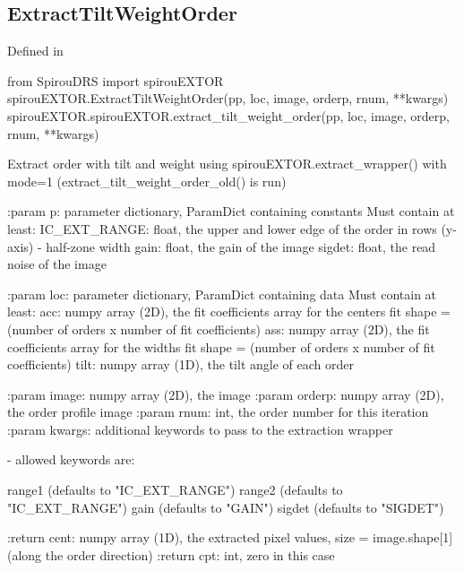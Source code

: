\noindent\begin{minipage}{\textwidth}
\subsection{ExtractTiltWeightOrder}

Defined in \spirouEXTOR{}

\begin{pythonbox}
from SpirouDRS import spirouEXTOR
spirouEXTOR.ExtractTiltWeightOrder(pp, loc, image, orderp, rnum, **kwargs)
spirouEXTOR.spirouEXTOR.extract_tilt_weight_order(pp, loc, image, orderp, rnum, **kwargs)
\end{pythonbox}

\begin{pythondocstring}
Extract order with tilt and weight using
spirouEXTOR.extract_wrapper() with mode=1
(extract_tilt_weight_order_old() is run)

:param p: parameter dictionary, ParamDict containing constants
    Must contain at least:
            IC_EXT_RANGE: float, the upper and lower edge of the order
                          in rows (y-axis) - half-zone width
            gain: float, the gain of the image
            sigdet: float, the read noise of the image

:param loc: parameter dictionary, ParamDict containing data
        Must contain at least:
            acc: numpy array (2D), the fit coefficients array for
                  the centers fit
                  shape = (number of orders x number of fit coefficients)
            ass: numpy array (2D), the fit coefficients array for
                  the widths fit
                  shape = (number of orders x number of fit coefficients)
            tilt: numpy array (1D), the tilt angle of each order

:param image: numpy array (2D), the image
:param orderp: numpy array (2D), the order profile image
:param rnum: int, the order number for this iteration
:param kwargs: additional keywords to pass to the extraction wrapper

        - allowed keywords are:

        range1  (defaults to "IC_EXT_RANGE")
        range2  (defaults to "IC_EXT_RANGE")
        gain    (defaults to "GAIN")
        sigdet  (defaults to "SIGDET")

:return cent: numpy array (1D), the extracted pixel values,
             size = image.shape[1] (along the order direction)
:return cpt: int, zero in this case
\end{pythondocstring}
\end{minipage}

